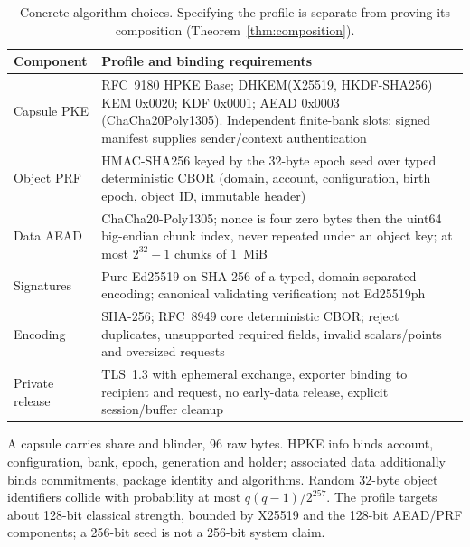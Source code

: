 \documentclass[pdflatex,sn-mathphys-num]{sn-jnl}
\theoremstyle{plain}
\theoremstyle{definition}
\begin{document}
\begin{table}[htbp]
\caption{Concrete algorithm choices. Specifying the profile is separate from proving its composition (Theorem~\ref{thm:composition}).}\label{tab:profile}
\centering\footnotesize
\begin{tabularx}{\linewidth}{@{}p{.24\linewidth}Y@{}}\toprule
Component & Profile and binding requirements\\\midrule
Capsule PKE & RFC~9180 HPKE Base; DHKEM(X25519, HKDF-SHA256) KEM 0x0020; KDF 0x0001; AEAD 0x0003 (ChaCha20Poly1305). Independent finite-bank slots; signed manifest supplies sender/context authentication~\cite{rfc9180}\\
Object PRF & HMAC-SHA256 keyed by the 32-byte epoch seed over typed deterministic CBOR (domain, account, configuration, birth epoch, object ID, immutable header)\\
Data AEAD & ChaCha20-Poly1305; nonce is four zero bytes then the uint64 big-endian chunk index, never repeated under an object key; at most $2^{32}-1$ chunks of 1~MiB~\cite{rfc8439}\\
Signatures & Pure Ed25519 on SHA-256 of a typed, domain-separated encoding; canonical validating verification; not Ed25519ph~\cite{rfc8032}\\
Encoding & SHA-256; RFC~8949 core deterministic CBOR; reject duplicates, unsupported required fields, invalid scalars/points and oversized requests~\cite{rfc8949}\\
Private release & TLS~1.3 with ephemeral exchange, exporter binding to recipient and request, no early-data release, explicit session/buffer cleanup~\cite{rfc8446}\\\bottomrule
\end{tabularx}
\end{table}

A capsule carries share and blinder, 96 raw bytes. HPKE info binds account, configuration, bank, epoch, generation and holder; associated data additionally binds commitments, package identity and algorithms. Random 32-byte object identifiers collide with probability at most $q(q-1)/2^{257}$. The profile targets about 128-bit classical strength, bounded by X25519 and the 128-bit AEAD/PRF components; a 256-bit seed is not a 256-bit system claim.
\end{document}
